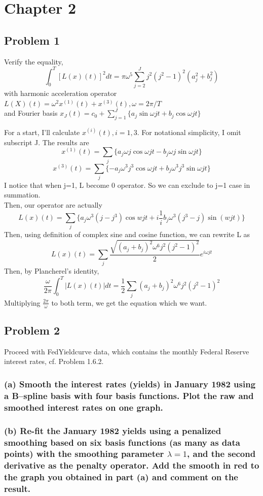 \documentclass{article}
\begin{document}
\newpage
\section{Chapter 2}
\subsection{Problem 1}
Verify the equality,
\[\int_{0}^{T}[L(x)(t)]^2dt=\pi\omega^5\sum_{j=2}^{J}j^2(j^2-1)^2(a_j^2+b_j^2)\]
with harmonic acceleration operator \(L(X)(t)=\omega^2x^{(1)}(t)+x^{(3)}(t), \omega=2\pi/T\) \\
and Fourier basis \(x_{J}(t)=c_0+\sum_{j=1}^{J}\{a_j\sin{\omega jt}+b_j\cos{\omega jt}\}\)

For a start, I'll calculate $x^{(i)}(t), i=1,3$. For notational simplicity, I omit subscript J. The results are
\[x^{(1)}(t) = \sum_{j} \{a_j\omega j \cos{\omega jt} - b_j\omega j \sin{\omega jt}\}\]
\[x^{(3)}(t) = \sum_{j} \{-a_j\omega^3 j^3 \cos{\omega jt} + b_j\omega^3 j^3 \sin{\omega jt}\}\]
I notice that when j=1, L become 0 operator. So we can exclude to j=1 case in summation. \\
Then, our operator are actually
\[L(x)(t)=\sum_{j}\{a_j\omega^3(j-j^3)\cos{wjt} + i\frac{1}{i}b_j\omega^3(j^3-j)\sin(wjt)\}\]
Then, using definition of complex sine and cosine function, we can rewrite L as
\[L(x)(t)=\sum_{j}\frac{\sqrt{(a_j+b_j)^2\omega^6j^2(j^2-1)^2}}{2}e^{i\omega jt}\]
Then, by Plancherel's identity,
\[\frac{\omega}{2\pi} \int_{0}^{T}|L(x)(t)|dt = \frac{1}{2}\sum_{j}(a_j+b_j)^2\omega^6j^2(j^2-1)^2\]
Multiplying $\frac{2\pi}{\omega}$ to both term, we get the equation which we want.


\newpage
\subsection{Problem 2}
Proceed with FedYieldcurve data, which contains the monthly Federal Reserve interest rates, cf. Problem 1.6.2.

\subsubsection*{(a) Smooth the interest rates (yields) in January 1982 using a B–spline basis 
with four basis functions. Plot the raw and smoothed interest rates on one graph.}
\subsubsection*{(b) Re-fit the January 1982 yields using a penalized smoothing based on six basis functions 
(as many as data points) with the smoothing parameter $\lambda = 1$, 
and the second derivative as the penalty operator. Add the smooth in red to the graph you obtained 
in part (a) and comment on the result.}
\end{document}
